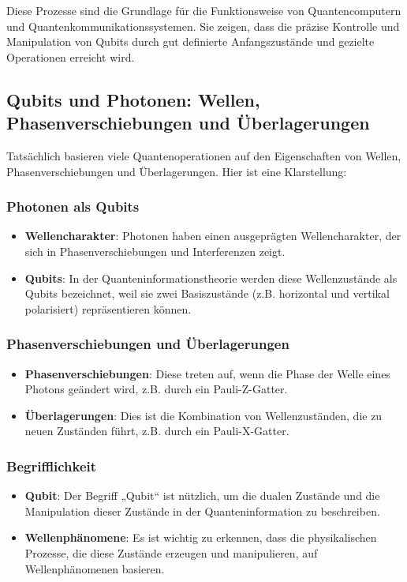 \documentclass[12pt,a4paper]{article}
\begin{document}
	Diese Prozesse sind die Grundlage für die Funktionsweise von Quantencomputern und Quantenkommunikationssystemen. Sie zeigen, dass die präzise Kontrolle und Manipulation von Qubits durch gut definierte Anfangszustände und gezielte Operationen erreicht wird.
	
	
	
	\subsection{Qubits und Photonen: Wellen, Phasenverschiebungen und Überlagerungen}
	
	Tatsächlich basieren viele Quantenoperationen auf den Eigenschaften von Wellen, Phasenverschiebungen und Überlagerungen. Hier ist eine Klarstellung:
	
	\subsubsection{Photonen als Qubits}
	\begin{itemize}
		\item \textbf{Wellencharakter}: Photonen haben einen ausgeprägten Wellencharakter, der sich in Phasenverschiebungen und Interferenzen zeigt.
		\item \textbf{Qubits}: In der Quanteninformationstheorie werden diese Wellenzustände als Qubits bezeichnet, weil sie zwei Basiszustände (z.B. horizontal und vertikal polarisiert) repräsentieren können.
	\end{itemize}
	
	\subsubsection{Phasenverschiebungen und Überlagerungen}
	\begin{itemize}
		\item \textbf{Phasenverschiebungen}: Diese treten auf, wenn die Phase der Welle eines Photons geändert wird, z.B. durch ein Pauli-Z-Gatter.
		\item \textbf{Überlagerungen}: Dies ist die Kombination von Wellenzuständen, die zu neuen Zuständen führt, z.B. durch ein Pauli-X-Gatter.
	\end{itemize}
	
	\subsubsection{Begrifflichkeit}
	\begin{itemize}
		\item \textbf{Qubit}: Der Begriff „Qubit“ ist nützlich, um die dualen Zustände und die Manipulation dieser Zustände in der Quanteninformation zu beschreiben.
		\item \textbf{Wellenphänomene}: Es ist wichtig zu erkennen, dass die physikalischen Prozesse, die diese Zustände erzeugen und manipulieren, auf Wellenphänomenen basieren.
	\end{itemize}
	
\end{document}
